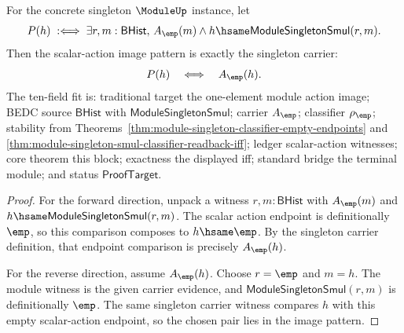 \begin{theorem}
\label{thm:module-singleton-smul-image-carrier-exact}
For the concrete singleton $\ModuleUp$ instance, let
$$
P(h)\;:\Longleftrightarrow\;\exists r,m:\mathsf{BHist},\,
  A_{\emp}(m)\wedge h\hsame\mathsf{ModuleSingletonSmul}(r,m).
$$
Then the scalar-action image pattern is exactly the singleton carrier:
$$
P(h)\quad\Longleftrightarrow\quad A_{\emp}(h).
$$
The ten-field fit is: traditional target the one-element module action image;
BEDC source $\mathsf{BHist}$ with $\mathsf{ModuleSingletonSmul}$; carrier
$A_{\emp}$; classifier $\rho_{\emp}$; stability from
Theorems~\ref{thm:module-singleton-classifier-empty-endpoints} and
\ref{thm:module-singleton-smul-classifier-readback-iff}; ledger scalar-action
witnesses; core theorem this block; exactness the displayed iff; standard
bridge the terminal module; and status $\mathsf{ProofTarget}$.
\end{theorem}
\begin{proof}
For the forward direction, unpack a witness
$r,m:\mathsf{BHist}$ with $A_{\emp}(m)$ and
$h\hsame\mathsf{ModuleSingletonSmul}(r,m)$. The scalar action endpoint is
definitionally $\emp$, so this comparison composes to $h\hsame\emp$. By the
singleton carrier definition, that endpoint comparison is precisely
$A_{\emp}(h)$.

For the reverse direction, assume $A_{\emp}(h)$. Choose $r=\emp$ and $m=h$.
The module witness is the given carrier evidence, and
$\mathsf{ModuleSingletonSmul}(r,m)$ is definitionally $\emp$. The same
singleton carrier witness compares $h$ with this empty scalar-action endpoint,
so the chosen pair lies in the image pattern.
\end{proof}

